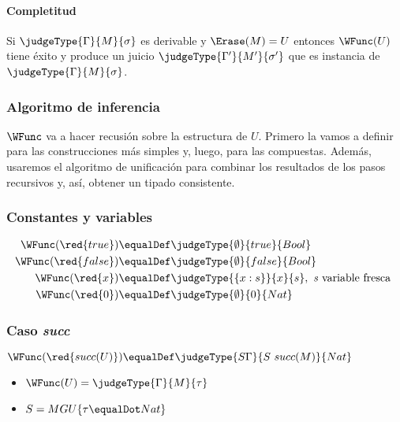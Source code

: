 \paragraph{Completitud} Si $\judgeType{\Gamma}{M}{\sigma}$ es derivable y $\Erase(M) = U$ entonces $\WFunc(U)$ tiene éxito y produce un juicio $\judgeType{\Gamma'}{M'}{\sigma'}$ que es instancia de $\judgeType{\Gamma}{M}{\sigma}$. 

\subsubsection{Algoritmo de inferencia}
$\WFunc$ va a hacer recusión sobre la estructura de $U$. Primero la vamos a definir para las construcciones más simples y, luego, para las compuestas. Además, usaremos el algoritmo de unificación para combinar los resultados de los pasos recursivos y, así, obtener un tipado consistente.

\subsubsection{Constantes y variables}
\begin{equation*}
	\begin{split}
		\WFunc(\red{true}) &\equalDef \judgeType{\emptyset}{true}{Bool} \\
		\WFunc(\red{false}) &\equalDef \judgeType{\emptyset}{false}{Bool} \\
		\WFunc(\red{x}) &\equalDef \judgeType{\{x:s\}}{x}{s}, \text{ \textit{s} variable fresca } \\
		\WFunc(\red{0}) &\equalDef \judgeType{\emptyset}{0}{Nat} \\
	\end{split}
\end{equation*}

\subsubsection{Caso \texorpdfstring{\textit{succ}}{succ}}
$\WFunc(\red{succ(U)}) \equalDef \judgeType{S\Gamma}{S~succ(M)}{Nat}$
\begin{centrado}
	\begin{itemize}
		\item $\WFunc(U) = \judgeType{\Gamma}{M}{\tau}$
		\item $S = MGU\{\tau\equalDot Nat\}$
	\end{itemize}
\end{centrado}

